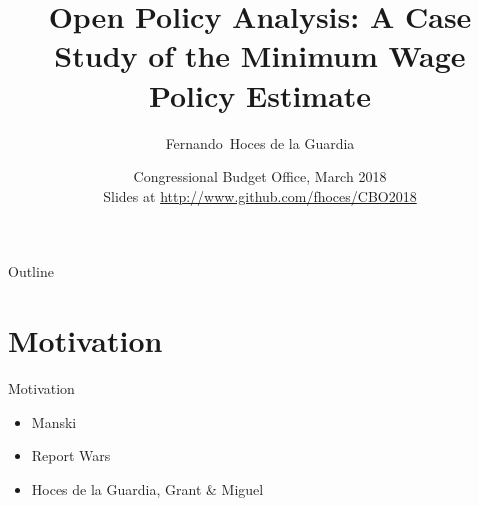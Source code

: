 \documentclass{beamer}
\title[OPA - Minimum Wage ] %
{Open Policy Analysis: A Case Study of the Minimum Wage Policy Estimate}
\subtitle
{}
\author[] %
{Fernando~Hoces de la Guardia\inst{1}}
\institute[Universities of Somewhere and Elsewhere] %
{
  \inst{1}%
  UC Berkeley:\\
  Berkeley Initiative for Transparency in the Social Sciences\\
}
\date[] %
{Congressional Budget Office, March 2018\\
{\small Slides at} \url{http://www.github.com/fhoces/CBO2018}}
\begin{document}
\begin{frame}
  \titlepage
\end{frame}

\begin{frame}{Outline}
  \tableofcontents
\end{frame}
 
\section{Motivation}

\begin{frame}{Motivation}
\begin{itemize}
\item Manski
\item Report Wars
\item Hoces de la Guardia, Grant \& Miguel
\end{itemize}
\end{frame}
\end{document}
